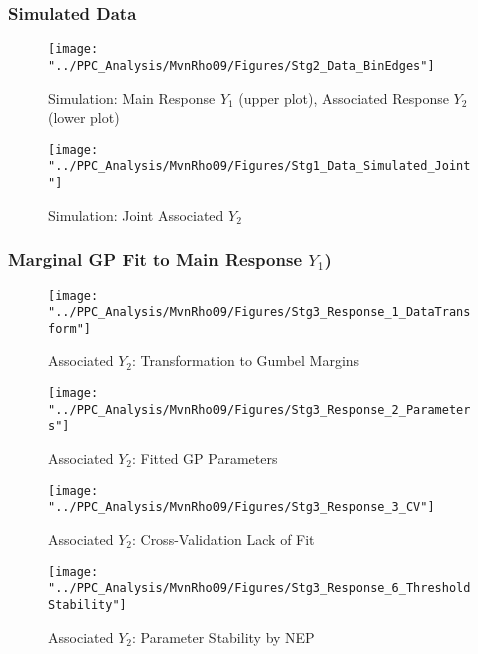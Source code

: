 
\subsubsection{Simulated Data}
\begin{figure}
	\centering
	\texttt{[image: "../PPC\_Analysis/MvnRho09/Figures/Stg2\_Data\_BinEdges"]}
	\caption{Simulation: Main Response $Y_{1}$ (upper plot), Associated Response $Y_{2}$ (lower plot)}
	\label{fig:CaseMvnSim}
\end{figure}

\begin{figure}
	\centering
	\texttt{[image: "../PPC\_Analysis/MvnRho09/Figures/Stg1\_Data\_Simulated\_Joint"]}
	\caption{Simulation: Joint Associated $Y_{2}$}
	\label{fig:CaseMvnSimJnt}
\end{figure}

\subsubsection{Marginal GP Fit to Main Response $Y_{1}$)}

\begin{figure}
	\centering
	\texttt{[image: "../PPC\_Analysis/MvnRho09/Figures/Stg3\_Response\_1\_DataTransform"]}
	\caption{Associated $Y_{2}$: Transformation to Gumbel Margins}
	\label{fig:CaseMvnMrg1DatTrns}
\end{figure}

\begin{figure}
	\centering
	\texttt{[image: "../PPC\_Analysis/MvnRho09/Figures/Stg3\_Response\_2\_Parameters"]}
	\caption{Associated $Y_{2}$: Fitted GP Parameters}
	\label{fig:CaseMvnMrg1Prm}
\end{figure}

\begin{figure}
	\centering
	\texttt{[image: "../PPC\_Analysis/MvnRho09/Figures/Stg3\_Response\_3\_CV"]}
	\caption{Associated $Y_{2}$: Cross-Validation Lack of Fit}
	\label{fig:CaseMvnMrg1CV}
\end{figure}

\begin{figure}
	\centering
	\texttt{[image: "../PPC\_Analysis/MvnRho09/Figures/Stg3\_Response\_6\_ThresholdStability"]}
	\caption{Associated $Y_{2}$: Parameter Stability by NEP}
	\label{fig:CaseMvnMrg1Thr}
\end{figure}


